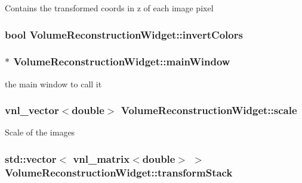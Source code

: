 Contains the transformed coords in z of each image pixel \hypertarget{class_volume_reconstruction_widget_a5c6d9354261c5494fab5d408da9ec13f}{
\subsubsection[{invert\-Colors}]{\setlength{\rightskip}{0pt plus 5cm}bool {\bf Volume\-Reconstruction\-Widget\-::invert\-Colors}}}\label{d5/d55/class_volume_reconstruction_widget_a5c6d9354261c5494fab5d408da9ec13f}
\hypertarget{class_volume_reconstruction_widget_a3c4a62c79152059201b1ace97af89691}{
\subsubsection[{main\-Window}]{$\ast$ {\bf Volume\-Reconstruction\-Widget\-::main\-Window}}}\label{d5/d55/class_volume_reconstruction_widget_a3c4a62c79152059201b1ace97af89691}
the main window to call it \hypertarget{class_volume_reconstruction_widget_ae236e766bdd26a8e1d3af5abc965b558}{
\subsubsection[{scale}]{\setlength{\rightskip}{0pt plus 5cm}vnl\-\_\-vector$<$double$>$ {\bf Volume\-Reconstruction\-Widget\-::scale}}}\label{d5/d55/class_volume_reconstruction_widget_ae236e766bdd26a8e1d3af5abc965b558}
Scale of the images \hypertarget{class_volume_reconstruction_widget_a184f596737a8ba01e74e2acb3843fcfc}{
\subsubsection[{transform\-Stack}]{\setlength{\rightskip}{0pt plus 5cm}std\-::vector$<$ vnl\-\_\-matrix$<$double$>$ $>$ {\bf Volume\-Reconstruction\-Widget\-::transform\-Stack}}}\label{d5/d55/class_volume_reconstruction_widget_a184f596737a8ba01e74e2acb3843fcfc}
